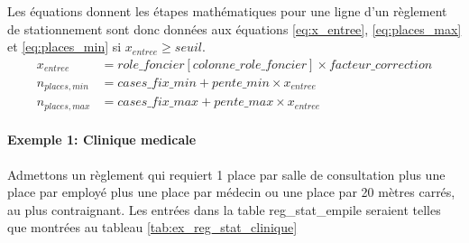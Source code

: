     \FloatBarrier
    Les équations donnent les étapes mathématiques pour une ligne d'un règlement de stationnement sont donc données aux équations \ref{eq:x_entree}, \ref{eq:places_max} et \ref{eq:places_min} si $x_{entree} \geq seuil $.
    \begin{align}
        x_{entree} &= role\_foncier[colonne\_role\_foncier] \times facteur\_correction \label{eq:x_entree}\\
        n_{places,min} &= cases\_fix\_min + pente\_min \times x_{entree} \label{eq:places_min}\\
        n_{places,max} &= cases\_fix\_max + pente\_max \times x_{entree} \label{eq:places_max}
    \end{align}
    \clearpage
    \paragraph{Exemple 1: Clinique medicale} Admettons un règlement qui requiert 1 place par salle de consultation  plus une place par employé plus une place par médecin ou une place par 20 mètres carrés, au plus contraignant. Les entrées dans la table reg\_stat\_empile seraient telles que montrées au tableau \ref{tab:ex_reg_stat_clinique}
